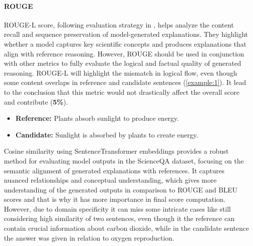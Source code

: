 \documentclass{article}
\begin{document}
\paragraph{ROUGE}
ROUGE-L score, following evaluation strategy in \cite{lu2022learn}, helps analyze the content recall and sequence preservation of model-generated explanations. They highlight whether a model captures key scientific concepts and produces explanations that align with reference reasoning. However, ROUGE should be used in conjunction with other metrics to fully evaluate the logical and factual quality of generated reasoning. ROUGE-L will highlight the mismatch in logical flow, even though some content overlaps in reference and candidate sentences (\ref{example:1}). It lead to the conclusion that this metric would not drastically affect the overall score and contribute (\textbf{5\%}).

\begin{example}
\label{example:1}
\begin{itemize}
    \item \textbf{Reference:} Plants absorb sunlight to produce energy.
    \item \textbf{Candidate:} Sunlight is absorbed by plants to create energy.
\end{itemize}
\end{example}

Cosine similarity using SentenceTransformer embeddings provides a robust method for evaluating model outputs in the ScienceQA dataset, focusing on the semantic alignment of generated explanations with references. It captures nuanced relationships and conceptual understanding, which gives more understanding of the generated outputs in comparison to ROUGE and BLEU scores and that is why it has more importance in final score computation. However, due to domain specificity it can miss some intricate cases like still considering high similarity of two sentences, even though it the reference can contain crucial information about carbon dioxide, while in the candidate sentence the answer was given in relation to oxygen reproduction.
\end{document}
